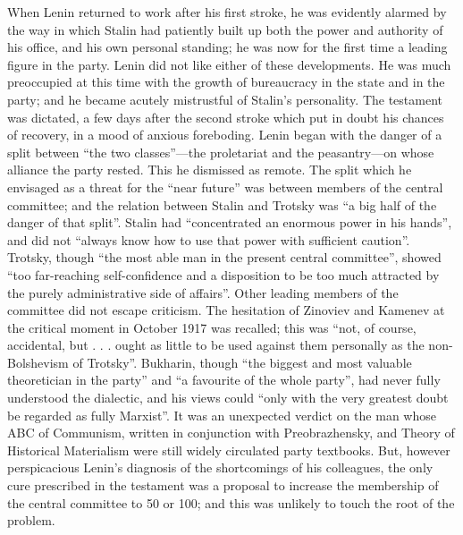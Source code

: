 When Lenin returned to work after his first stroke, he was evidently alarmed by the way in which Stalin had patiently built up both the power and authority of his office, and his own personal standing; he was now for the first time a leading figure in the party. Lenin did not like either of these developments. He was much preoccupied at this time with the growth of bureaucracy in the state and in the party; and he became acutely mistrustful of Stalin's personality. The testament was dictated, a few days after the second stroke which put in doubt his chances of recovery, in a mood of anxious foreboding. Lenin began with the danger of a split between ``the two classes''---the proletariat and the peasantry---on whose alliance the party rested. This he dismissed as remote. The split which he envisaged as a threat for the ``near future'' was between members of the central committee; and the relation between Stalin and Trotsky was ``a big half of the danger of that split''. Stalin had ``concentrated an enormous power in his hands'', and did not ``always know how to use that power with sufficient caution''. Trotsky, though ``the most able man in the present central committee'', showed ``too far-reaching self-confidence and a disposition to be too much attracted by the purely administrative side of affairs''. Other leading members of the committee did not escape criticism. The hesitation of Zinoviev and Kamenev at the critical moment in October 1917 was recalled; this was ``not, of course, accidental, but . . . ought as little to be used against them personally as the non-Bolshevism of Trotsky''. Bukharin, though ``the biggest and most valuable theoretician in the party'' and ``a favourite of the whole party'', had never fully understood the dialectic, and his views could ``only with the very greatest doubt be regarded as fully Marxist''. It was an unexpected verdict on the man whose ABC of Communism, written in conjunction with Preobrazhensky, and Theory of Historical Materialism were still widely circulated party textbooks. But, however perspicacious Lenin's diagnosis of the shortcomings of his colleagues, the only cure prescribed in the testament was a proposal to increase the membership of the central committee to 50 or 100; and this was unlikely to touch the root of the problem. 

